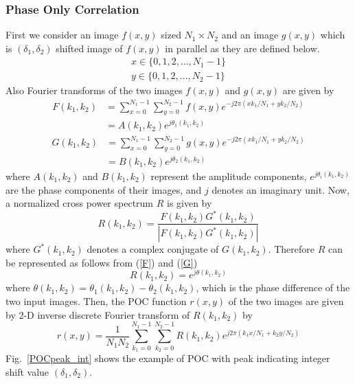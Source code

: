 \documentclass[a4paper,10pt,dvipdfmx,twocolumn,english]{jsarticle}
\begin{document}
\subsubsection{Phase Only Correlation}%
First we consider an image $f(x,y)$ sized $N_1 \times N_2$ and an image $g(x,y)$ 
   which is $(\delta_1,\delta_2)$ shifted image of $f(x,y)$ in parallel as they are defined below.
   \begin{align}
      x \in \{0, 1, 2,\ldots,N_1-1\} \\
      y \in \{0, 1, 2,\ldots,N_2-1\}
   \end{align}
Also Fourier transforms of the two images $f(x,y)$ and $g(x,y)$ are given by
   \begin{align}
      \label{F}
      F(k_1,k_2) &= \sum^{N_1-1}_{x=0}\sum^{N_2-1}_{y=0}f(x,y)e^{-j2\pi(xk_1/N_1 + yk_2/N_2)} \nonumber \\
         &= A(k_1,k_2)e^{j\theta_1(k_1,k_2)} 
   \end{align}
   \begin{align}
      G(k_1,k_2) &= \sum^{N_1-1}_{x=0}\sum^{N_2-1}_{y=0}g(x,y)e^{-j2\pi(xk_1/N_1 + yk_2/N_2)} \nonumber \\
         &= B(k_1,k_2)e^{j\theta_2(k_1,k_2)} 
      \label{G}
   \end{align}
   where $A(k_1,k_2)$ and $B(k_1,k_2)$ represent the amplitude components, 
   $e^{j\theta_i(k_1,k_2)}$ are the phase components of their images, 
   and $j$ denotes an imaginary unit.
Now, a normalized cross power spectrum $R$ is given by
   \begin{equation}
      R(k_1,k_2) = \frac {F(k_1,k_2) G^*(k_1,k_2)}{|F(k_1,k_2)  G^*(k_1,k_2)|}
   \end{equation}
   where $G^{*}(k_1,k_2)$ denotes a complex conjugate of $G(k_1,k_2)$.
Therefore $R$ can be represented as follows from (\ref{F}) and (\ref{G})
   \begin{equation}
      \label{eq_powspec}
      R(k_1,k_2) = e^{j\theta(k_1,k_2)}
   \end{equation}
   where $\theta(k_1,k_2) = \theta_1(k_1,k_2) - \theta_2(k_1,k_2)$, which is the phase difference of the two input images.
Then, the POC function $r(x, y)$ of the two images are given 
   by 2-D inverse discrete Fourier transform of $R(k_1,k_2)$ by
   \begin{equation}
      r(x,y) = \frac{1}{N_1N_2} \sum^{N_1-1}_{k_1=0}\sum^{N_2-1}_{k_2=0}R(k_1,k_2)e^{j2\pi(k_1x/N_1+k_2y/N_2)}
   \end{equation}
Fig.~\ref{POCpeak_int} shows the example of POC with peak indicating integer shift value $(\delta_1, \delta_2)$.
\end{document}
